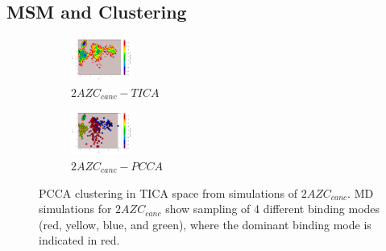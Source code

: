 

\subsection{MSM and Clustering}

\begin{figure}[!ht]
\centering
\begin{subfigure}{.5\textwidth}
  \centering
  \includegraphics[width=.9\linewidth]{chapter4/2AZC_canc/2AZC_canc-tica.pdf}
  \caption{$2AZC_{canc}-TICA$}
  \label{sup:2AZC_canc-tica}
\end{subfigure}%
\begin{subfigure}{.5\textwidth}
  \centering
  \includegraphics[width=.9\linewidth]{chapter4/2AZC_canc/2AZC_canc-pcca.pdf}
  \caption{$2AZC_{canc}-PCCA$}
  \label{sup:2AZC_canc-pcca}
\end{subfigure}
\caption[PCCA Clustering of $2AZC_{canc}$]{PCCA clustering in TICA space from simulations of $2AZC_{canc}$. MD simulations for $2AZC_{canc}$ show sampling of 4 different binding modes (red, yellow, blue, and green), where the dominant binding mode is indicated in red.}
\label{sup:2AZC_canc-cluster}
\end{figure}

